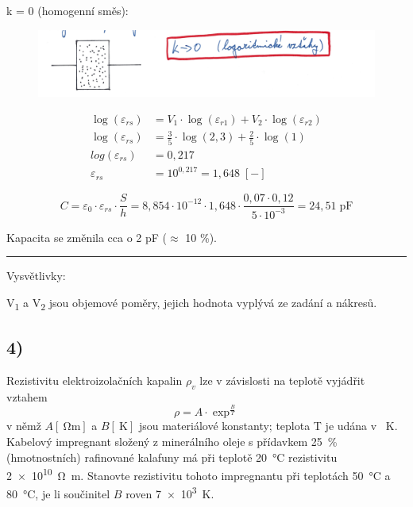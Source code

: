 \newpage

k = 0 (homogenní směs):

\begin{figure}[h]
    \centering
    \includegraphics[width=.7\textwidth]{images/ul3_C3.jpg}
\end{figure}

\begin{align*}
    \log(\varepsilon_{rs}) &= V_1 \cdot \log(\varepsilon_{r1}) + V_2 \cdot \log(\varepsilon_{r2}) \\
    \log(\varepsilon_{rs}) &= \frac{3}{5} \cdot \log(2,3) + \frac{2}{5} \cdot \log(1) \\
    log(\varepsilon_{rs}) &= 0,217 \\
    \varepsilon_{rs} &= 10^{0,217} = 1,648 \; [-]
\end{align*}

\begin{equation*}
    C = \varepsilon_0 \cdot \varepsilon_{rs} \cdot \frac{S}{h} = 8,854 \cdot 10^{-12} \cdot 1,648 \cdot \frac{0,07 \cdot 0,12}{5 \cdot 10^{-3}} = 24,51 \; \si{\pico\farad}
\end{equation*}

Kapacita se změnila cca o 2 \si{\pico\farad} ($\approx$ 10 \si{\percent}).

\noindent\rule{8cm}{0.4pt}

Vysvětlivky:

V\textsubscript{1} a V\textsubscript{2} jsou objemové poměry, jejich hodnota vyplývá ze zadání a nákresů.

\newpage


\subsection*{4)}
Rezistivitu elektroizolačních kapalin $\rho_v$ lze v závislosti na teplotě vyjádřit vztahem
\begin{equation}
    \rho=A\cdot\exp^\frac{B}{T}
\end{equation}
v němž $A [\SI{}{\ohm\meter}]$ a $B [\SI{}{\kelvin}]$ jsou materiálové konstanty; teplota T je udána v \SI{}{\kelvin}. Kabelový impregnant složený z minerálního oleje s přídavkem \SI{25}{\percent} (hmotnostních) rafinované kalafuny má při teplotě \SI{20}{\degreeCelsius} rezistivitu \SI{2e10}{\ohm\meter}. Stanovte rezistivitu tohoto impregnantu při teplotách \SI{50}{\degreeCelsius} a \SI{80}{\degreeCelsius}, je li součinitel $B$ roven \SI{7e3}{\kelvin}.

